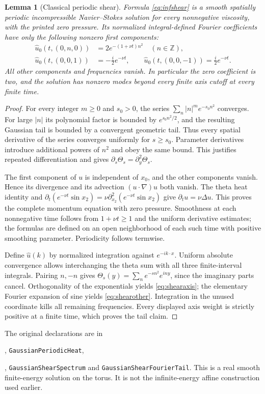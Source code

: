 \documentclass[11pt]{article}
\newtheorem{lemma}[theorem]{Lemma}
\newcommand{\code}[1]{{\small\nolinkurl{#1}}}
\begin{document}
\begin{lemma}[Classical periodic shear]\label{lem:infshear}
Formula \eqref{eq:infshear} is a smooth spatially periodic incompressible
Navier--Stokes solution for every nonnegative viscosity, with the printed
zero pressure. Its normalized integral-defined Fourier coefficients have
only the following nonzero first components:
\begin{align}
 \widehat u_0(t,(0,n,0))&=2e^{-(1+\nu t)n^2}\quad(n\in\mathbb Z),\label{eq:shearaxis}\\
 \widehat u_0(t,(0,0,1))&=-\tfrac i2e^{-\nu t},\qquad
 \widehat u_0(t,(0,0,-1))=\tfrac i2e^{-\nu t}.\label{eq:shearother}
\end{align}
All other components and frequencies vanish. In particular the zero
coefficient is two, and the solution has nonzero modes beyond every finite
axis cutoff at every finite time.
\end{lemma}
\begin{proof}
For every integer $m\geq0$ and $s_0>0$, the series
$\sum_n|n|^m e^{-s_0n^2}$ converges. For large $|n|$ its polynomial factor
is bounded by $e^{s_0n^2/2}$, and the resulting Gaussian tail is bounded by
a convergent geometric tail. Thus every spatial derivative of the series
converges uniformly for $s\geq s_0$. Parameter derivatives introduce
additional powers of $n^2$ and obey the same bound. This justifies repeated
differentiation and gives
$\partial_s\Theta_s=\partial_y^2\Theta_s$.

The first component of $u$ is independent of $x_0$, and the other components
vanish. Hence its divergence and its advection $(u\cdot\nabla)u$ both vanish.
The theta heat identity and
$\partial_t(e^{-\nu t}\sin x_2)=\nu\partial_{x_2}^2(e^{-\nu t}\sin x_2)$
give $\partial_tu=\nu\Delta u$. This proves the complete momentum equation
with zero pressure. Smoothness at each nonnegative time follows from
$1+\nu t\geq1$ and the uniform derivative estimates; the formulas are defined
on an open neighborhood of each such time with positive smoothing parameter.
Periodicity follows termwise.

\begingroup\raggedright
Define $\widehat u(k)$ by normalized integration against $e^{-ik\cdot x}$.
Uniform absolute convergence allows interchanging the theta sum with all
three finite-interval integrals. Pairing $n,-n$ gives
$\Theta_s(y)=\sum_n e^{-sn^2}e^{iny}$, since the imaginary parts cancel.
Orthogonality of the exponentials yields \eqref{eq:shearaxis}; the elementary
Fourier expansion of sine yields \eqref{eq:shearother}. Integration in the
unused coordinate kills all remaining frequencies. Every displayed axis
weight is strictly positive at a finite time, which proves the tail claim.
\end{proof}
The original declarations are in
\par\noindent\code{GaussianFourierJets},
\code{GaussianPeriodicHeat},
\par\noindent\code{GaussianInfiniteShear},
\code{GaussianShearSpectrum} and \code{GaussianShearFourierTail}.
This is a real smooth finite-energy solution on the torus. It is not the
infinite-energy affine construction used earlier.
\par\endgroup
\end{document}
